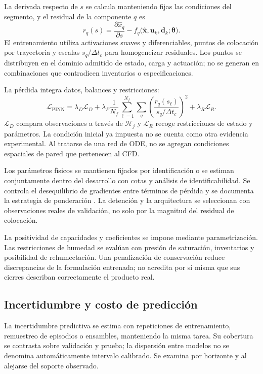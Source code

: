 La derivada respecto de $s$ se calcula manteniendo fijas las condiciones del segmento, y el residual de la componente $q$ es
\begin{equation}
r_q(s)=
\frac{\partial\widehat x_q}{\partial s}
-f_q\bigl(
\widehat{\mathbf x},\mathbf u_k,\mathbf d_k;
\boldsymbol\theta
\bigr).
\label{met:residual_pinn}
\end{equation}
El entrenamiento utiliza activaciones suaves y diferenciables, puntos de colocación por trayectoria y escalas $s_q/\Delta t_c$ para homogeneizar residuales. Los puntos se distribuyen en el dominio admitido de estado, carga y actuación; no se generan en combinaciones que contradicen inventarios o especificaciones.

La pérdida integra datos, balances y restricciones:
\begin{equation}
\mathcal L_{\mathrm{PINN}}=
\lambda_D\mathcal L_D+
\lambda_F\frac{1}{N_f}
\sum_{\ell=1}^{N_f}\sum_q
\left(\frac{r_q(s_\ell)}{s_q/\Delta t_c}\right)^2
+\lambda_R\mathcal L_R.
\label{met:perdida_pinn}
\end{equation}
$\mathcal L_D$ compara observaciones a través de $\mathcal H_j$ y $\mathcal L_R$ recoge restricciones de estado y parámetros. La condición inicial ya impuesta no se cuenta como otra evidencia experimental. Al tratarse de una red de ODE, no se agregan condiciones espaciales de pared que pertenecen al CFD.

Los parámetros físicos se mantienen fijados por identificación o se estiman conjuntamente dentro del desarrollo con cotas y análisis de identificabilidad. Se controla el desequilibrio de gradientes entre términos de pérdida y se documenta la estrategia de ponderación \cite{wang2021}. La detención y la arquitectura se seleccionan con observaciones reales de validación, no solo por la magnitud del residual de colocación.

La positividad de capacidades y coeficientes se impone mediante parametrización. Las restricciones de humedad se evalúan con presión de saturación, inventarios y posibilidad de rehumectación. Una penalización de conservación reduce discrepancias de la formulación entrenada; no acredita por sí misma que sus cierres describan correctamente el producto real.

\subsection{Incertidumbre y costo de predicción}

La incertidumbre predictiva se estima con repeticiones de entrenamiento, remuestreo de episodios o ensambles, manteniendo la misma tarea. Su cobertura se contrasta sobre validación y prueba; la dispersión entre modelos no se denomina automáticamente intervalo calibrado. Se examina por horizonte y al alejarse del soporte observado.


